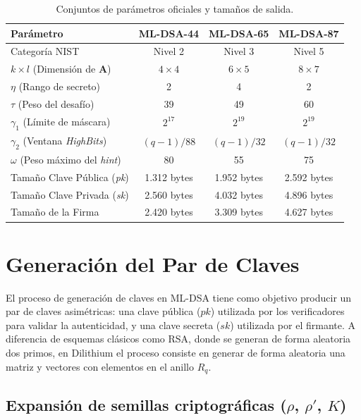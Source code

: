 \documentclass[11pt, a4paper]{report}
\theoremstyle{definition}
\begin{document}
\vspace{0.5cm}
\begin{table}[H]
\centering
\renewcommand{\arraystretch}{1.3}
\begin{tabular}{|l|c|c|c|}
\hline
\rowcolor[HTML]{EFEFEF} 
\textbf{Parámetro} & \textbf{ML-DSA-44} & \textbf{ML-DSA-65} & \textbf{ML-DSA-87} \\ \hline
Categoría NIST & Nivel 2 & Nivel 3 & Nivel 5 \\ \hline
$k \times l$ (Dimensión de $\mathbf{A}$) & $4 \times 4$ & $6 \times 5$ & $8 \times 7$ \\ \hline
$\eta$ (Rango de secreto) & 2 & 4 & 2 \\ \hline
$\tau$ (Peso del desafío) & 39 & 49 & 60 \\ \hline
$\gamma_1$ (Límite de máscara) & $2^{17}$ & $2^{19}$ & $2^{19}$ \\ \hline
$\gamma_2$ (Ventana \textit{HighBits}) & $(q-1)/88$ & $(q-1)/32$ & $(q-1)/32$ \\ \hline
$\omega$ (Peso máximo del \textit{hint}) & 80 & 55 & 75 \\ \hline
Tamaño Clave Pública (\textit{pk}) & 1.312 bytes & 1.952 bytes & 2.592 bytes \\ \hline
Tamaño Clave Privada (\textit{sk}) & 2.560 bytes & 4.032 bytes & 4.896 bytes \\ \hline
Tamaño de la Firma & 2.420 bytes & 3.309 bytes & 4.627 bytes \\ \hline
\end{tabular}
\caption{Conjuntos de parámetros oficiales y tamaños de salida.}
\label{tab:parametros_mldsa}
\end{table}
\vspace{0.5cm}

\section{Generación del Par de Claves}

El proceso de generación de claves en ML-DSA tiene como objetivo producir un par de claves asimétricas: una clave pública ($pk$) utilizada por los verificadores para validar la autenticidad, y una clave secreta ($sk$) utilizada por el firmante. A diferencia de esquemas clásicos como RSA, donde se generan de forma aleatoria dos primos, en Dilithium el proceso consiste en generar de forma aleatoria una matriz y vectores con elementos en el anillo $R_q$.


\subsection{Expansión de semillas criptográficas ($\rho$, $\rho'$, $K$)}
\end{document}
